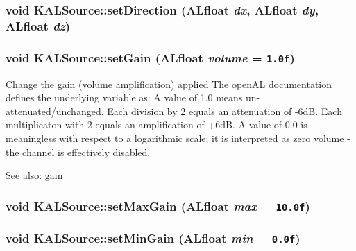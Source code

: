 \hypertarget{class_k_a_l_source_ec1cb92c08a1c4cf767afde34bb466a7}{
\subsubsection[{setDirection}]{\setlength{\rightskip}{0pt plus 5cm}void KALSource::setDirection (ALfloat {\em dx}, \/  ALfloat {\em dy}, \/  ALfloat {\em dz})}}
\label{class_k_a_l_source_ec1cb92c08a1c4cf767afde34bb466a7}


\hypertarget{class_k_a_l_source_831dcd53e81bf704bf70974790298322}{
\subsubsection[{setGain}]{\setlength{\rightskip}{0pt plus 5cm}void KALSource::setGain (ALfloat {\em volume} = {\tt 1.0f})}}
\label{class_k_a_l_source_831dcd53e81bf704bf70974790298322}


Change the gain (volume amplification) applied The openAL documentation defines the underlying variable as: A value of 1.0 means un-attenuated/unchanged. Each division by 2 equals an attenuation of -6dB. Each multiplicaton with 2 equals an amplification of +6dB. A value of 0.0 is meaningless with respect to a logarithmic scale; it is interpreted as zero volume - the channel is effectively disabled. \begin{Desc}
\item[See also:]\hyperlink{class_k_a_l_source_f29819a83267c47424a4f3fab8281a41}{gain} \end{Desc}
\hypertarget{class_k_a_l_source_579afe70c88657e7e09ce5ac29d001d1}{
\subsubsection[{setMaxGain}]{\setlength{\rightskip}{0pt plus 5cm}void KALSource::setMaxGain (ALfloat {\em max} = {\tt 10.0f})}}
\label{class_k_a_l_source_579afe70c88657e7e09ce5ac29d001d1}


\hypertarget{class_k_a_l_source_39fad788e416543df01548f717f21f0c}{
\subsubsection[{setMinGain}]{\setlength{\rightskip}{0pt plus 5cm}void KALSource::setMinGain (ALfloat {\em min} = {\tt 0.0f})}}
\label{class_k_a_l_source_39fad788e416543df01548f717f21f0c}


